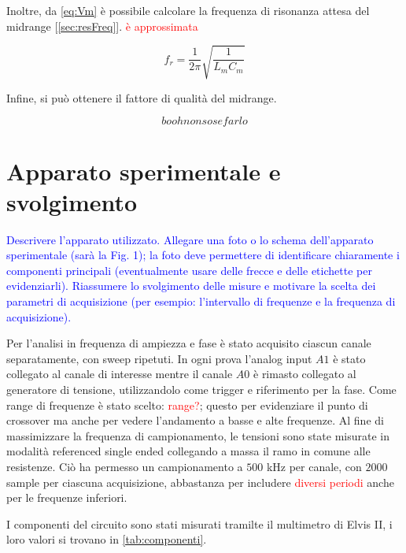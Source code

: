 \documentclass[12pt,italian]{article}
\newcommand{\prof}[1]{\textcolor{blue}{#1}}
\newcommand{\err}[1]{\textcolor{red}{#1}}
\begin{document}
\noindent
Inoltre, da \eqref{eq:Vm} è possibile calcolare la frequenza di risonanza attesa del midrange [\ref{sec:resFreq}].
\err{è approssimata}

\begin{equation}
  f_{r} = \frac{1}{2\pi}\sqrt{\frac{1}{L_{m} C_{m}}}  %
  \label{eq:fr}
\end{equation}

\noindent
Infine, si può ottenere il fattore di qualità del midrange.

\begin{equation}
  booh non so se farlo
\end{equation}

\section*{Apparato sperimentale e svolgimento}
\prof{ Descrivere l'apparato utilizzato. Allegare una foto o lo schema
  dell'apparato sperimentale (sarà la Fig. 1); la foto deve permettere di
  identificare chiaramente i componenti principali (eventualmente usare delle
  frecce e delle etichette per evidenziarli). Riassumere lo svolgimento delle
  misure e motivare la scelta dei parametri di acquisizione (per esempio:
  l'intervallo di frequenze e la frequenza di acquisizione). }

Per l'analisi in frequenza di ampiezza e fase è stato acquisito ciascun canale
separatamente, con sweep ripetuti. In ogni prova l'analog input $A1$ è stato
collegato al canale di interesse mentre il canale $A0$ è rimasto collegato al
generatore di tensione, utilizzandolo come trigger e riferimento per la fase.
Come range di frequenze è stato scelto: \err{range?}; questo per evidenziare il
punto di crossover ma anche per vedere l'andamento a basse e alte frequenze. Al
fine di massimizzare la frequenza di campionamento, le tensioni sono state
misurate in modalità referenced single ended collegando a massa il ramo in
comune alle resistenze. Ciò ha permesso un campionamento a $500$ kHz per
canale, con $2000$ sample per ciascuna acquisizione, abbastanza per includere
\err{diversi periodi} anche per le frequenze inferiori.

I componenti del circuito sono stati misurati tramilte il multimetro di Elvis
II, i loro valori si trovano in \cref{tab:componenti}.
\end{document}
